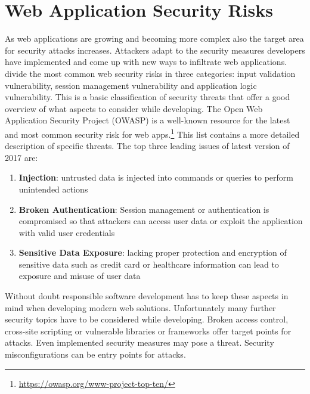 \section{Web Application Security Risks}
As web applications are growing and becoming more complex also the target area for security attacks increases. Attackers adapt to the security measures developers have implemented and come up with new ways to infiltrate web applications.\newline
\textcite[5]{Li2014} divide the most common web security risks in three categories: input validation vulnerability, session management vulnerability and application logic vulnerability. This is a basic classification of security threats that offer a good overview of what aspects to consider while developing. The Open Web Application Security Project (OWASP) is a well-known resource for the latest and most common security risk for web apps.\footnote{ \url{https://owasp.org/www-project-top-ten/}} This list contains a more detailed description of specific threats. The top three leading issues of latest version of 2017 are: 

\begin{enumerate}
    \item \textbf{Injection}: untrusted data is injected into commands or queries to perform unintended actions
    \item \textbf{Broken Authentication}: Session management or authentication is compromised so that attackers can access user data or exploit the application with valid user credentials    
    \item \textbf{Sensitive Data Exposure}: lacking proper protection and encryption of sensitive data such as credit card or healthcare information can lead to exposure and misuse of user data
\end{enumerate}

Without doubt responsible software development has to keep these aspects in mind when developing modern web solutions. Unfortunately many further security topics have to be considered while developing. Broken access control, cross-site scripting or vulnerable libraries or frameworks offer target points for attacks. Even implemented security measures may pose a threat. Security misconfigurations can be entry points for attacks.\newline




 
